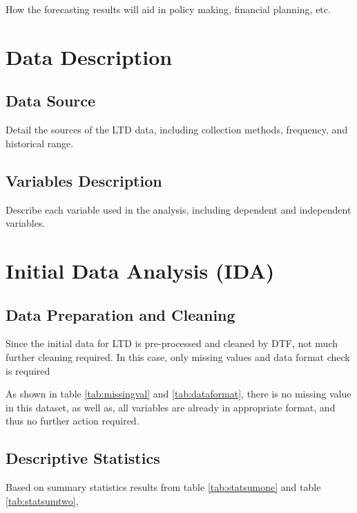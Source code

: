 \documentclass[11pt,a4paper,]{article}
\begin{document}
How the forecasting results will aid in policy making, financial planning, etc.

\section{Data Description}\label{data-description}

\subsection{Data Source}\label{data-source}

Detail the sources of the LTD data, including collection methods, frequency, and historical range.

\subsection{Variables Description}\label{variables-description}

Describe each variable used in the analysis, including dependent and independent variables.

\section{Initial Data Analysis (IDA)}\label{initial-data-analysis-ida}

\subsection{Data Preparation and Cleaning}\label{data-preparation-and-cleaning}

Since the initial data for LTD is pre-processed and cleaned by DTF, not much further cleaning required. In this case, only missing values and data format check is required

As shown in table \ref{tab:missingval} and \ref{tab:dataformat}, there is no missing value in this dataset, as well as, all variables are already in appropriate format, and thus no further action required.

\subsection{Descriptive Statistics}\label{descriptive-statistics}

Based on summary statistics results from table \ref{tab:statsumone} and table \ref{tab:statsumtwo},
\end{document}
